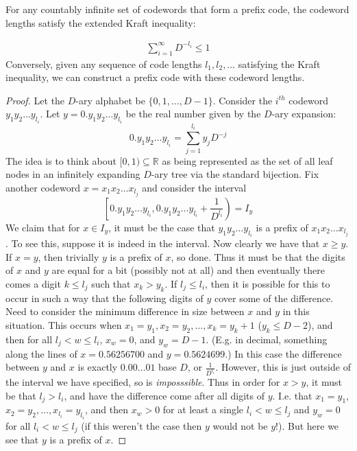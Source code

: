 \begin{theorem}
    For any countably infinite set of codewords that form a prefix code, the codeword lengths satisfy the extended Kraft inequality:

    \begin{align}
        \sum_{i=1}^{\infty} D^{-l_i} \leq 1
    \end{align}
    Conversely, given any sequence of code lengths $l_1,l_2,\ldots$ satisfying the Kraft inequality, we can construct a prefix code with these codeword lengths. 

    \begin{proof}
        Let the $D$-ary alphabet be $\{0,1,\ldots,D-1\}$. Consider the $i^{th}$ codeword $y_1y_2\ldots y_{l_i}$. Let $y = 0.y_1y_2\ldots y_{l_i}$ be the real number given by the $D$-ary expansion:
        \begin{equation}
            0.y_1y_2\ldots y_{l_i} = \sum_{j=1}^{l_i} y_jD^{-j}
        \end{equation}
        The idea is to think about $[0,1) \subseteq \mathbb{R}$ as being represented as the set of all leaf nodes in an infinitely expanding $D$-ary tree via the standard bijection. Fix another codeword $x = x_1x_2\ldots x_{l_j}$ and consider the interval
        \begin{equation}
            \left[0.y_1y_2\ldots y_{l_i}, 0.y_1y_2\ldots y_{l_i} + \frac{1}{D^{l_i}} \right) = I_y
        \end{equation}
        We claim that for $x \in I_y$, it must be the case that $y_1y_2 \ldots y_{l_i}$ is a prefix of $x_1x_2\ldots x_{l_j}$. To see this, suppose it is indeed in the interval. Now clearly we have that $x \geq y$. If $x = y$, then trivially $y$ is a prefix of $x$, so done. Thus it must be that the digits of $x$ and $y$ are equal for a bit (possibly not at all) and then eventually there comes a digit $k \leq l_j$ such that $x_k > y_k$. If $l_j \leq l_i$, then it is possible for this to occur in such a way that the following digits of $y$ cover some of the difference. Need to consider the minimum difference in size between $x$ and $y$ in this situation. This occurs when $x_1 = y_1, x_2 = y_2, \ldots, x_k = y_k+1$ ($y_k \leq D-2$), and then for all $l_j < w \leq l_i$, $x_w = 0$, and $y_w = D-1$. (E.g. in decimal, something along the lines of $x = 0.56256700$ and $y = 0.5624699$.) In this case the difference between $y$ and $x$ is exactly $0.00\ldots01$ base $D$, or $\frac{1}{D^{l_i}}$. However, this is just outside of the interval we have specified, so is \emph{imposssible}. Thus in order for $x > y$, it must be that $l_j > l_i$, and have the difference come after all digits of $y$. I.e. that $x_1 = y_1$, $x_2 = y_2,\ldots,x_{l_i} = y_{l_i}$, and then $x_w > 0$ for at least a single $l_i < w \leq l_j$ and $y_w = 0$ for all $l_i < w \leq l_j$ (if this weren't the case then $y$ would not be $y$!). But here we see that $y$ is a prefix of $x$. 


\end{proof}
\end{theorem}
